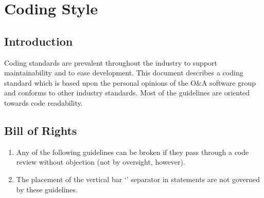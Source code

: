 %
%
%
%

\chapter{Coding Style}

\section{Introduction}

Coding standards are prevalent throughout the industry to support
maintainability and to ease development.  This document describes a coding
standard which is based upon the personal opinions of the O\&A software group 
and conforms to other industry standards.
Most of the guidelines are oriented towards code readability.

\section{Bill of Rights}

\begin{enumerate}
\item
    Any of the following guidelines can be broken if they pass through a code
    review without objection (not by oversight, however).
\item
    The placement of the vertical bar `\code{|}' separator in 
     statements are not governed by these guidelines.
\end{enumerate}

